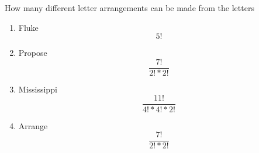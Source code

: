\item How many different letter arrangements can be made from the letters
\begin{enumerate}
    \item Fluke
    \[ 5! \]
    \item Propose
    \[ \frac{7!}{2! * 2!} \]
    \item Mississippi
    \[ \frac{11!}{4! * 4! * 2!} \]
    \item Arrange
    \[ \frac{7!}{2! * 2!} \]
\end{enumerate}